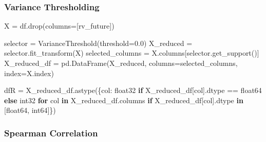 \documentclass[
  letterpaper,
  DIV=11,
  numbers=noendperiod]{scrartcl}
\newenvironment{Shaded}{\begin{snugshade}}{\end{snugshade}}
\newcommand{\ControlFlowTok}[1]{\textcolor[rgb]{0.00,0.23,0.31}{\textbf{#1}}}
\newcommand{\FloatTok}[1]{\textcolor[rgb]{0.68,0.00,0.00}{#1}}
\newcommand{\KeywordTok}[1]{\textcolor[rgb]{0.00,0.23,0.31}{\textbf{#1}}}
\newcommand{\NormalTok}[1]{\textcolor[rgb]{0.00,0.23,0.31}{#1}}
\newcommand{\OperatorTok}[1]{\textcolor[rgb]{0.37,0.37,0.37}{#1}}
\newcommand{\StringTok}[1]{\textcolor[rgb]{0.13,0.47,0.30}{#1}}
\begin{document}
\subsubsection{Variance Thresholding}\label{variance-thresholding}

\begin{Shaded}
\begin{Highlighting}[]
\NormalTok{X }\OperatorTok{=}\NormalTok{ df.drop(columns}\OperatorTok{=}\NormalTok{[}\StringTok{\textquotesingle{}rv\_future\textquotesingle{}}\NormalTok{])}
\end{Highlighting}
\end{Shaded}

\begin{Shaded}
\begin{Highlighting}[]
\NormalTok{selector }\OperatorTok{=}\NormalTok{ VarianceThreshold(threshold}\OperatorTok{=}\FloatTok{0.0}\NormalTok{)}
\NormalTok{X\_reduced }\OperatorTok{=}\NormalTok{ selector.fit\_transform(X)}
\NormalTok{selected\_columns }\OperatorTok{=}\NormalTok{ X.columns[selector.get\_support()]}
\NormalTok{X\_reduced\_df }\OperatorTok{=}\NormalTok{ pd.DataFrame(X\_reduced, columns}\OperatorTok{=}\NormalTok{selected\_columns, index}\OperatorTok{=}\NormalTok{X.index)}
\end{Highlighting}
\end{Shaded}

\begin{Shaded}
\begin{Highlighting}[]
\NormalTok{dfR }\OperatorTok{=}\NormalTok{ X\_reduced\_df.astype(\{col: }\StringTok{\textquotesingle{}float32\textquotesingle{}} \ControlFlowTok{if}\NormalTok{ X\_reduced\_df[col].dtype }\OperatorTok{==} \StringTok{\textquotesingle{}float64\textquotesingle{}} \ControlFlowTok{else} \StringTok{\textquotesingle{}int32\textquotesingle{}} 
                \ControlFlowTok{for}\NormalTok{ col }\KeywordTok{in}\NormalTok{ X\_reduced\_df.columns }
                \ControlFlowTok{if}\NormalTok{ X\_reduced\_df[col].dtype }\KeywordTok{in}\NormalTok{ [}\StringTok{\textquotesingle{}float64\textquotesingle{}}\NormalTok{, }\StringTok{\textquotesingle{}int64\textquotesingle{}}\NormalTok{]\})}
\end{Highlighting}
\end{Shaded}

\subsubsection{Spearman Correlation}\label{spearman-correlation}
\end{document}
